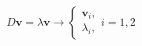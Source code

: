 \documentclass[preview]{standalone}
\begin{document}
\begin{align*}
D \bm v = \lambda \bm v  \to \begin{cases} \bm v_i,\\ \lambda_i, \end{cases} i=1,2
\end{align*}
\end{document}
